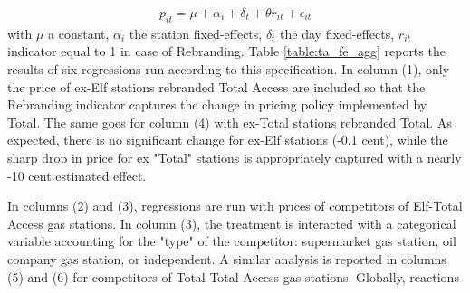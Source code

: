 \documentclass[11pt]{article}
\begin{document}
\begin{align*}
p_{it} = \mu + \alpha_i + \delta_t + \theta r_{it} + \epsilon_{it}
\end{align*}
with $\mu$ a constant, $\alpha_i$ the station fixed-effects, $\delta_t$ the day fixed-effects, $r_{it}$ indicator equal to 1 in case of Rebranding. Table \ref{table:ta_fe_agg} reports the results of six regressions run according to this specification. In column (1), only the price of ex-Elf stations rebranded Total Access are included so that the Rebranding indicator captures the change in pricing policy implemented by Total. The same goes for column (4) with ex-Total stations rebranded Total. As expected, there is no significant change for ex-Elf stations (-0.1 cent), while the sharp drop in price for ex "Total" stations is appropriately captured with a nearly -10 cent estimated effect.

In columns (2) and (3), regressions are run with prices of competitors of Elf-Total Access gas stations. In column (3), the treatment is interacted with a categorical variable accounting for the "type" of the competitor: supermarket gas station, oil company gas station, or independent. A similar analysis is reported in columns (5) and (6) for competitors of Total-Total Access gas stations. Globally, reactions 
\end{document}
